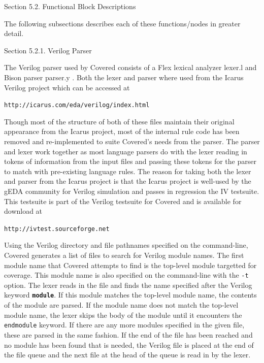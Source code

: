\begin{Desc}
\item[Section 5.2.  Functional Block Descriptions]\par
 The following subsections describes each of these functions/nodes in greater detail.\end{Desc}
\begin{Desc}
\item[Section 5.2.1.  Verilog Parser]\par
 The Verilog parser used by Covered consists of a Flex lexical analyzer lexer.l and  Bison parser parser.y . Both the lexer and parser where used from the Icarus Verilog project which can be accessed at

 {\tt http://icarus.com/eda/verilog/index.html}

 Though most of the structure of both of these files maintain their original appearance from the Icarus project, most of the internal rule code has been removed and re-implemented to suite Covered's needs from the parser. The parser and lexer work together as most language parsers do with the lexer reading in tokens of information from the input files and passing these tokens for the parser to match with pre-existing language rules. The reason for taking both the lexer and parser from the Icarus project is that the Icarus project is well-used by the g\-EDA community for Verilog simulation and passes in regression the IV testsuite. This testsuite is part of the Verilog testsuite for Covered and is available for download at

 {\tt http://ivtest.sourceforge.net}

 Using the Verilog directory and file pathnames specified on the command-line, Covered generates a list of files to search for Verilog module names. The first module name that Covered attempts to find is the top-level module targetted for coverage. This module name is also specified on the command-line with the {\tt -t} option. The lexer reads in the file and finds the name specified after the Verilog keyword {\tt {\bf module}}. If this module matches the top-level module name, the contents of the module are parsed. If the module name does not match the top-level module name, the lexer skips the body of the module until it  encounters the {\tt endmodule} keyword. If there are any more modules specified in the given file, these are parsed in the same fashion. If the end of the file has been reached and no module has been found that is needed, the Verilog file is placed at the end of the file  queue and the next file at the head of the queue is read in by the lexer.


\end{Desc}
